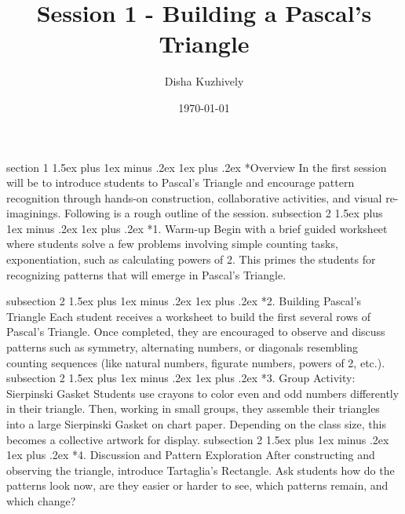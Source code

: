 \documentclass[a4paper,twoside,notitlepage,
11pt,
]{amsart}
\makeatletter
\renewcommand{\section}{\@startsection
  {section}%
  {1}%
  {\z@}%
  {1.5ex plus 1ex minus .2ex}%
  {1ex plus .2ex}%
  {\normalfont\bfseries}}%
\renewcommand{\subsection}{\@startsection
    {subsection}%
    {2}%
    {\z@}%
    {1.5ex plus 1ex minus .2ex}%
    {1ex plus .2ex}%
    {\normalfont\itshape}}%
\makeatother
\begin{document}
\title[Pascal's Triangle]{Session 1 - Building a Pascal's Triangle}
\author{Disha Kuzhively}
\address{\textit{International Centre for Theoretical Sciences - TIFR, Bangalore}}
\date{\today}
\maketitle
\section*{Overview}
In the first session will be to introduce students to Pascal's Triangle and encourage pattern recognition through hands-on construction, collaborative activities, and visual re-imaginings. Following is a rough outline of the session.
\subsection*{1. Warm-up}
Begin with a brief guided worksheet where students solve a few problems involving simple counting tasks, exponentiation, such as calculating powers of 2. This primes the students for recognizing patterns that will emerge in Pascal's Triangle.



\subsection*{2. Building Pascal's Triangle}
Each student receives a worksheet to build the first several rows of Pascal's Triangle. Once completed, they are encouraged to observe and discuss patterns such as symmetry, alternating numbers, or diagonals resembling counting sequences (like natural numbers, figurate numbers, powers of 2, etc.).
\subsection*{3. Group Activity: Sierpinski Gasket}
Students use crayons to color even and odd numbers differently in their triangle. Then, working in small groups, they assemble their triangles into a large Sierpinski Gasket on chart paper. Depending on the class size, this becomes a collective artwork for display.
\subsection*{4. Discussion and Pattern Exploration}
After constructing and observing the triangle, introduce Tartaglia's Rectangle. Ask students how do the patterns look now, are they easier or harder to see, which patterns remain, and which change?
\end{document}
